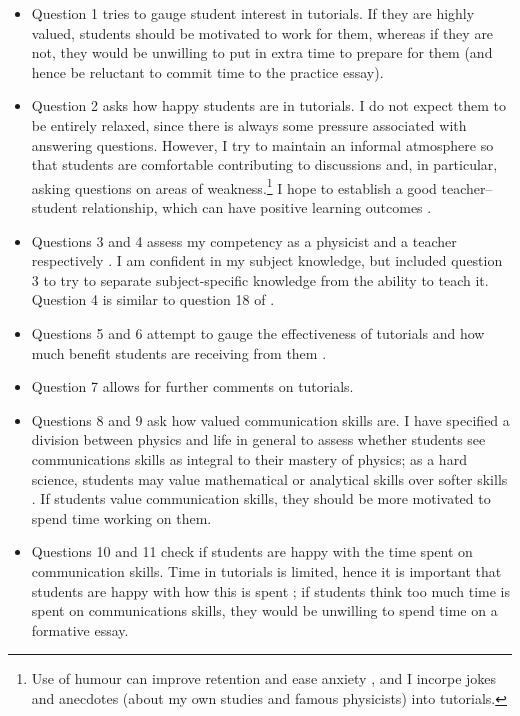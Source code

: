 \begin{itemize}
\item Question 1 tries to gauge student interest in tutorials. If they are highly valued, students should be motivated to work for them, whereas if they are not, they would be unwilling to put in extra time to prepare for them (and hence be reluctant to commit time to the practice essay).
\item Question 2 asks how happy students are in tutorials. I do not expect them to be entirely relaxed, since there is always some pressure associated with answering questions. However, I try to maintain an informal atmosphere so that students are comfortable contributing to discussions and, in particular, asking questions on areas of weakness.\footnote{Use of humour can improve retention and ease anxiety \citep[e.g.,][and references therein]{Korobkin1988,Lesser2008}, and I incorpe jokes and anecdotes (about my own studies and famous physicists) into tutorials.} I hope to establish a good teacher--student relationship, which can have positive learning outcomes \citep{Cornelius-White2007}.
\item Questions 3 and 4 assess my competency as a physicist and a teacher respectively \citep[cf.][figure 4.15, section A]{Brown1988}. I am confident in my subject knowledge, but included question 3 to try to separate subject-specific knowledge from the ability to teach it. Question 4 is similar to question 18 of \citet[appendix]{Ramsden1992}.
\item Questions 5 and 6 attempt to gauge the effectiveness of tutorials and how much benefit students are receiving from them \citep[cf.][figure 4.15, section B]{Brown1988}.
\item Question 7 allows for further comments on tutorials.
\item Questions 8 and 9 ask how valued communication skills are. I have specified a division between physics and life in general to assess whether students see communications skills as integral to their mastery of physics; as a hard science, students may value mathematical or analytical skills over softer skills \citep[cf.][figure 5.4]{Kolb1984}. If students value communication skills, they should be more motivated to spend time working on them.
\item Questions 10 and 11 check if students are happy with the time spent on communication skills. Time in tutorials is limited, hence it is important that students are happy with how this is spent \citep[cf.][appendix, question 30]{Ramsden1992}; if students think too much time is spent on communications skills, they would be unwilling to spend time on a formative essay.

\end{itemize}
